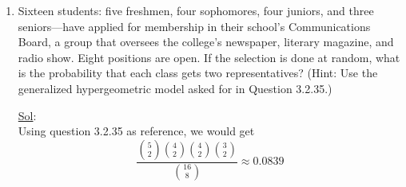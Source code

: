 \begin{enumerate}
    \underline{Sol}:\\
    $$
    \begin{aligned}
      & \text{Let } P(k) = \frac{\binom{r}{k}
      \binom{w}{n-k}}{\binom{N}{n}} \text{ and } P(k+1) =
      \frac{\binom{r}{k + 1} \binom{w}{n - k - 1}}{\binom{N}{n}}. \\
      \\
      & \frac{P(k+1)}{P(k)} = \frac{\binom{r}{k+1}
      \binom{w}{n-k-1}}{\binom{N}{n}} \cdot
      \frac{\binom{N}{n}}{\binom{r}{k} \binom{w}{n-k}} =
      \frac{\binom{r}{k+1}}{\binom{r}{k}} \cdot
      \frac{\binom{w}{n-k-1}}{\binom{w}{n-k}} \\
      \\
      & \text{Expanding the first term: } \\
      & \frac{\binom{r}{k+1}}{\binom{r}{k}} =
      \frac{\frac{r!}{(k+1)!(r-k-1)!}}{\frac{r!}{k!(r-k)!}} =
      \frac{k!(r-k)!}{(k+1)!(r-k-1)!} = \frac{k!}{(k+1)k!} \cdot
      \frac{(r-k)(r-k-1)!}{(r-k-1)!} = \frac{r-k}{k+1} \\
      \\
      & \text{Expanding the second term: } \\
      & \frac{\binom{w}{n-k-1}}{\binom{w}{n-k}} =
      \frac{\frac{w!}{(n-k-1)!(w-(n-k-1))!}}{\frac{w!}{(n-k)!(w-(n-k))!}}
      = \frac{(n-k)!(w-n+k)!}{(n-k-1)!(w-n+k+1)!} \\
      & \frac{\binom{w}{n-k-1}}{\binom{w}{n-k}} =
      \frac{(n-k)(n-k-1)!}{(n-k-1)!} \cdot
      \frac{(w-n+k)!}{(w-n+k+1)(w-n+k)!} = \frac{n-k}{w-n+k+1} \\
      \\
      & \text{Multiplying the simplified terms: } \\
      & \frac{P(k+1)}{P(k)} = \frac{r-k}{k+1} \cdot
      \frac{n-k}{w-n+k+1} = \frac{n - k}{k + 1} \cdot \frac{r - k}{w
      - n + k + 1}
    \end{aligned}$$

  \item[36.] Sixteen students: five freshmen, four sophomores, four
    juniors, and three seniors—have applied for membership in their
    school’s Communications Board, a group that oversees the
    college’s newspaper, literary magazine, and radio show. Eight
    positions are open. If the selection is done at random, what is
    the probability that each class gets two representatives? (Hint:
    Use the generalized hypergeometric model asked for in Question 3.2.35.)

    \underline{Sol}:\\
    Using question 3.2.35 as reference, we would get
    \[
      \frac{\binom{5}{2} \binom{4}{2} \binom{4}{2}
      \binom{3}{2}}{\binom{16}{8}} \approx \boxed{0.0839}
    \]
\end{enumerate}

